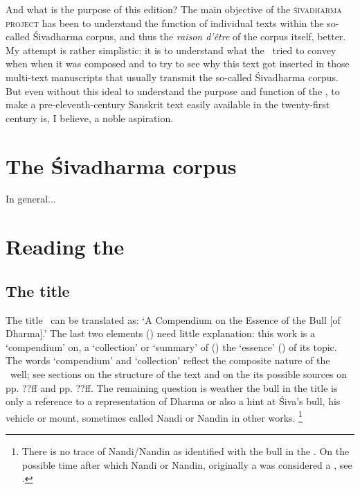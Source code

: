 \documentclass[11pt]{book}
\begin{document}
And what is the purpose of this edition? The main 
objective of the \textsc{śiva\-dharma project} 
has been to understand the function of 
individual texts within the so-called Śivadharma corpus,
and thus the \emph{raison d'être} of the corpus itself,
better. My attempt is rather simplistic: it is to understand
what the \Vss\ tried to convey when when it was composed and
to try to see why this text got inserted in those multi-text 
manuscripts that usually transmit the so-called Śivadharma corpus.
But even without this ideal to understand the purpose and function 
of the \Vss, to make a pre-eleventh-century
Sanskrit text easily available in the twenty-first century is, I believe, 
a noble aspiration.

\vfill
\pagebreak










\thispagestyle{empty}
\frenchspacing





\section{The Śivadharma corpus}
\fancyhead[LE]{}
\fancyhead[RE]{}
\fancyhead[LO]{}
\fancyhead[RO]{}

In general...

\section{Reading the \Vsssc}

\subsection{The title}
The title \Vss\ can be translated as:
`A Compendium on the Essence of the Bull [of Dharma].'
The last two elements () need
little explanation: this work is a 
`compendium' on, a `collection' or `summary' of ()
the `essence' () of its topic. The words 
`compendium' and `collection' reflect the composite nature of
the \Vss\ well; see sections on the structure of the text and
on the its possible sources on pp. ??ff and pp. ??ff.
The remaining question is weather the bull in the title 
is only a reference to a representation of Dharma 
or also a hint at Śiva's bull, his vehicle or mount, 
sometimes called Nandi or Nandin in other works.%
		\footnote{There is no trace of Nandi/Nandin 
		as identified with the bull in the \Vss.
		On the possible time after which 
		Nandi or Nandin, originally a  
		was considered a , see 
		.}
\end{document}
